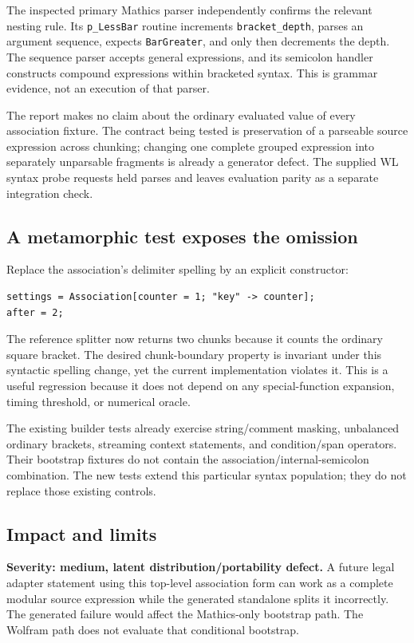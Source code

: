 \documentclass[11pt,letterpaper]{article}
\newcommand{\code}[1]{\nolinkurl{#1}}
\begin{document}
The inspected primary Mathics parser independently confirms the relevant nesting rule. Its \code{p_LessBar} routine increments \code{bracket_depth}, parses an argument sequence, expects \code{BarGreater}, and only then decrements the depth. The sequence parser accepts general expressions, and its semicolon handler constructs compound expressions within bracketed syntax. This is grammar evidence, not an execution of that parser.\cite{mathicsparser}

The report makes no claim about the ordinary evaluated value of every association fixture. The contract being tested is preservation of a parseable source expression across chunking; changing one complete grouped expression into separately unparsable fragments is already a generator defect. The supplied WL syntax probe requests held parses and leaves evaluation parity as a separate integration check.

\subsection{A metamorphic test exposes the omission}
Replace the association's delimiter spelling by an explicit constructor:
\begin{lstlisting}
settings = Association[counter = 1; "key" -> counter];
after = 2;
\end{lstlisting}
The reference splitter now returns two chunks because it counts the ordinary square bracket. The desired chunk-boundary property is invariant under this syntactic spelling change, yet the current implementation violates it. This is a useful regression because it does not depend on any special-function expansion, timing threshold, or numerical oracle.

The existing builder tests already exercise string/comment masking, unbalanced ordinary brackets, streaming context statements, and condition/span operators. Their bootstrap fixtures do not contain the association/internal-semicolon combination. The new tests extend this particular syntax population; they do not replace those existing controls.\cite{buildertests}

\subsection{Impact and limits}
\textbf{Severity: medium, latent distribution/portability defect.} A future legal adapter statement using this top-level association form can work as a complete modular source expression while the generated standalone splits it incorrectly. The generated failure would affect the Mathics-only bootstrap path. The Wolfram path does not evaluate that conditional bootstrap.
\end{document}
